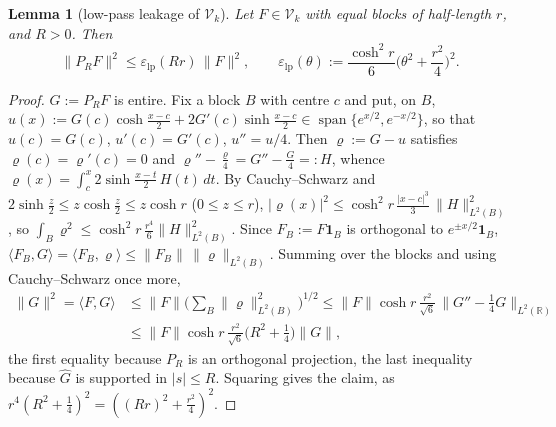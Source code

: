 \documentclass[11pt]{amsart}
\newtheorem{lemma}[theorem]{Lemma}
\theoremstyle{definition}
\theoremstyle{remark}
\newcommand{\R}{\mathbb R}
\begin{document}
\begin{lemma}[low-pass leakage of $\mathcal V_k$]\label{lem:coer-lowpass}
Let $F\in\mathcal V_k$ with equal blocks of half-length $r$, and $R>0$. Then
\[
\|P_RF\|^2\le\varepsilon_{\mathrm{lp}}(Rr)\,\|F\|^2,\qquad \varepsilon_{\mathrm{lp}}(\theta):=\frac{\cosh^2r}{6}\Big(\theta^2+\frac{r^2}4\Big)^2 .
\]
\end{lemma}
\begin{proof}
$G:=P_RF$ is entire. Fix a block $B$ with centre $c$ and put, on $B$,
$u(x):=G(c)\cosh\frac{x-c}2+2G'(c)\sinh\frac{x-c}2\in\operatorname{span}\{e^{x/2},e^{-x/2}\}$, so that
$u(c)=G(c)$, $u'(c)=G'(c)$, $u''=u/4$. Then $\varrho:=G-u$ satisfies $\varrho(c)=\varrho'(c)=0$ and
$\varrho''-\frac\varrho4=G''-\frac G4=:H$, whence $\varrho(x)=\int_c^x2\sinh\frac{x-t}2\,H(t)\,dt$. By Cauchy--Schwarz and
$2\sinh\frac z2\le z\cosh\frac z2\le z\cosh r$ ($0\le z\le r$),
$|\varrho(x)|^2\le\cosh^2r\,\frac{|x-c|^3}3\,\|H\|_{L^2(B)}^2$, so $\int_B\varrho^2\le\cosh^2r\,\frac{r^4}6\|H\|_{L^2(B)}^2$.
Since $F_B:=F\mathbf 1_B$ is orthogonal to $e^{\pm x/2}\mathbf 1_B$, $\langle F_B,G\rangle=\langle F_B,\varrho\rangle\le\|F_B\|\,\|\varrho\|_{L^2(B)}$.
Summing over the blocks and using Cauchy--Schwarz once more,
\begin{align*}
\|G\|^2=\langle F,G\rangle&\le\|F\|\Big(\sum_B\|\varrho\|_{L^2(B)}^2\Big)^{1/2}\le\|F\|\cosh r\,\frac{r^2}{\sqrt6}\,\|G''-\tfrac14G\|_{L^2(\R)}\\
&\le\|F\|\cosh r\,\frac{r^2}{\sqrt6}\Big(R^2+\frac14\Big)\|G\|,
\end{align*}
the first equality because $P_R$ is an orthogonal projection, the last inequality because
$\widehat G$ is supported in $|s|\le R$. Squaring gives the claim, as $r^4(R^2+\frac14)^2=((Rr)^2+\frac{r^2}4)^2$.
\end{proof}
\end{document}
